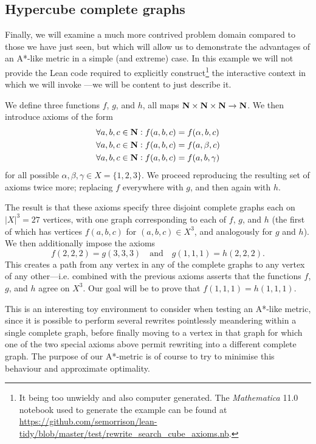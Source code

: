 \documentclass[12pt]{article}
\begin{document}
\subsection{Hypercube complete graphs}

Finally, we will examine a much more contrived problem domain compared to those we have just seen, but which will allow us to demonstrate the advantages of an A*-like metric in a simple (and extreme) case. In this example we will not provide the Lean code required to explicitly construct\footnote{It being too unwieldy and also computer generated. The \textit{Mathematica}\texttrademark{} 11.0 notebook used to generate the example can be found at \url{https://github.com/semorrison/lean-tidy/blob/master/test/rewrite_search_cube_axioms.nb}.} the interactive context in which we will invoke ---we will be content to just describe it.

We define three functions $f$, $g$, and $h$, all maps $\mathbf{N} \times \mathbf{N} \times \mathbf{N} \to \mathbf{N}$. We then introduce axioms of the form
\begin{align*}
  &\forall a, b, c \in \mathbf{N} : f(a, b, c) = f(\alpha, b, c)\\
  &\forall a, b, c \in \mathbf{N} : f(a, b, c) = f(a, \beta, c)\\
  &\forall a, b, c \in \mathbf{N} : f(a, b, c) = f(a, b, \gamma)
\end{align*}
for all possible $\alpha, \beta, \gamma \in X = \{1, 2, 3\}$. We proceed reproducing the resulting set of axioms twice more; replacing $f$ everywhere with $g$, and then again with $h$.

The result is that these axioms specify three disjoint complete graphs each on $\lvert X \rvert^3 = 27$ vertices, with one graph corresponding to each of $f$, $g$, and $h$ (the first of which has vertices $f(a, b, c)$ for $(a, b, c) \in X^3$, and analogously for $g$ and $h$). We then additionally impose the axioms
\begin{equation*}
f(2,2,2) = g(3,3,3) \quad \text{and} \quad g(1,1,1) = h(2,2,2).
\end{equation*}
This creates a path from any vertex in any of the complete graphs to any vertex of any other---i.e. combined with the previous axioms asserts that the functions $f$, $g$, and $h$ agree on $X^3$. Our goal will be to prove that $f(1,1,1) = h(1,1,1)$.

This is an interesting toy environment to consider when testing an A*-like metric, since it is possible to perform several rewrites pointlessly meandering within a single complete graph, before finally moving to a vertex in that graph for which one of the two special axioms above permit rewriting into a different complete graph. The purpose of our A*-metric is of course to try to minimise this behaviour and approximate optimality.
\end{document}
